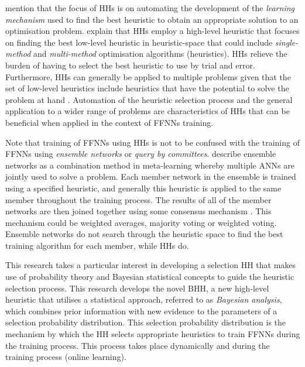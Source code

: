 \citeauthor{ref:grobler:2012} \cite{ref:grobler:2012} mention that the focus of \acp{HH} is on automating the development of the \textit{learning mechanism} used to find the best heuristic to obtain an appropriate solution to an optimisation problem. \citeauthor{ref:grobler:2012} explain that \acp{HH} employ a high-level heuristic that focuses on finding the best low-level heuristic in heuristic-space that could include \textit{single-method} and \textit{multi-method} optimisation algorithms (heuristics). \acp{HH} relieve the burden of having to select the best heuristic to use by trial and error. Furthermore, \acp{HH} can generally be applied to multiple problems given that the set of low-level heuristics include heuristics that have the potential to solve the problem at hand \cite{ref:burke:2010}. Automation of the heuristic selection process and the general application to a wider range of problems are characteristics of \acp{HH} that can be beneficial when applied in the context of \acp{FFNN} training.

Note that training of \acp{FFNN} using \acp{HH} is not to be confused with the training of \acp{FFNN} using \textit{ensemble networks} or \textit{query by committees}. \citeauthor{ref:pappa:2014} \cite{ref:pappa:2014} describe ensemble networks as a combination method in meta-learning whereby multiple \acp{ANN} are jointly used to solve a problem. Each member network in the ensemble is trained using a specified heuristic, and generally this heuristic is applied to the same member throughout the training process. The results of all of the member networks are then joined together using some consensus mechanism \cite{ref:zhou:2002}. This mechanism could be weighted averages, majority voting or weighted voting. Ensemble networks do not search through the heuristic space to find the best training algorithm for each member, while \acp{HH} do.

This research takes a particular interest in developing a selection \acs{HH} that makes use of probability theory and Bayesian statistical concepts to guide the heuristic selection process. This research develops the novel \Acf{BHH}, a new high-level heuristic that utilises a statistical approach, referred to as \textit{Bayesian analysis}, which combines prior information with new evidence to the parameters of a selection probability distribution. This selection probability distribution is the mechanism by which the \ac{HH} selects appropriate heuristics to train \acp{FFNN} during the training process. This process takes place dynamically and during the training process (online learning).


